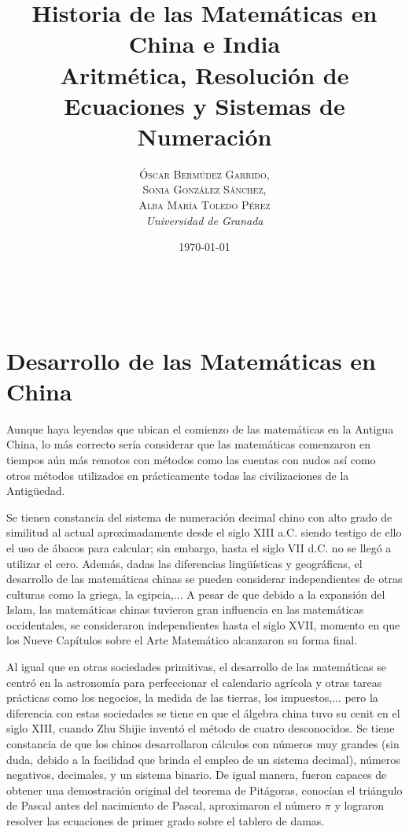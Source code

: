 \documentclass[a4paper, 11pt]{article}
\title{\textbf{Historia de las Matemáticas en China e India}\\ %
Aritmética, Resolución de Ecuaciones y Sistemas de Numeración} %
\author{ \textsc{Óscar Bermúdez Garrido, \\
		Sonia González Sánchez,\\ 
		Alba María Toledo Pérez} %
\\{\textit{Universidad de Granada}}} %
\date{\today} %
\makeatletter
\renewcommand{\maketitle}{
  \begin{flushright} %
  
  {\LARGE\@title} %
  
  \vspace{50pt} %
  
  {\large\@author} %
  \\\@date %
  \vspace{40pt} %
  \end{flushright}
}
\makeatother
\begin{document}
\maketitle %

\renewcommand{\abstractname}{Resumen} %



{\parskip=2pt
  \tableofcontents
}
\pagebreak


\section{Desarrollo de las Matemáticas en China}
	Aunque haya leyendas que ubican el comienzo de las matemáticas en la Antigua China, lo más correcto sería considerar
	que las matemáticas comenzaron en tiempos aún más remotos con métodos como las cuentas con nudos así como otros métodos
	utilizados en prácticamente todas las civilizaciones de la Antigüedad.
	
	Se tienen constancia del sistema de numeración decimal chino con alto grado de similitud al actual aproximadamente
	desde el siglo XIII a.C. siendo testigo de ello el uso de ábacos para calcular; sin embargo, hasta el siglo VII d.C.
	no se llegó a utilizar el cero. Además, dadas las diferencias lingüísticas y geográficas, el desarrollo de las matemáticas
	chinas se pueden considerar independientes de otras culturas como la griega, la egipcia,... A pesar de que debido a la
	expansión del Islam, las matemáticas chinas tuvieron gran influencia en las matemáticas occidentales, se consideraron
	independientes hasta el siglo XVII, momento en que los Nueve Capítulos sobre el Arte Matemático alcanzaron su forma final.
	
	Al igual que en otras sociedades primitivas, el desarrollo de las matemáticas se centró en la astronomía para perfeccionar
	el calendario agrícola y otras tareas prácticas como los negocios, la medida de las tierras, los impuestos,... pero
	la diferencia con estas sociedades se tiene en que el álgebra china tuvo su cenit en el siglo XIII, cuando Zhu Shijie
	inventó el método de cuatro desconocidos. Se tiene constancia de que los chinos desarrollaron cálculos con números
	muy grandes (sin duda, debido a la facilidad que brinda el empleo de un sistema decimal), números negativos, decimales,
	y un sistema binario. De igual manera, fueron capaces de obtener una demostración original del teorema de Pitágoras,
	conocían el triángulo de Pascal antes del nacimiento de Pascal, aproximaron el número $\pi$ y lograron resolver las
	ecuaciones de primer grado sobre el tablero de damas.
	
\end{document}
